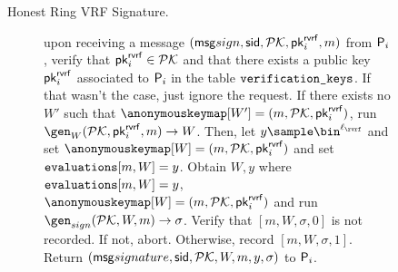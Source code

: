 \begin{figure}
\begin{tcolorbox}
{\begin{description}
				
				\item[Honest Ring VRF Signature.] upon receiving a message $(\mathsf{msg}{sign}, \textsf{sid}, {\mathcal{PK}}, \mathsf{pk}^{\mathsf{rvrf}}_i, m)$ from $\mathsf{P}_i$, verify that $\mathsf{pk}^{\mathsf{rvrf}}_i \in {\ensuremath{\mathcal{PK}}}$ and that there exists a public key $\mathsf{pk}^{\mathsf{rvrf}}_i$ associated to $\mathsf{P}_i$ in the table $ \texttt{verification\_keys} $. If that wasn't the case, just ignore the request. 	
				If there exists no $ W' $ such that $ \anonymouskeymap[W'] = (m, \pkring, \pkrvrf_i) $, run $ \gen_W(\pkring, \pkrvrf_i, m) \rightarrow W$. Then, let $y \sample \bin^{\ell_\rvrf}$ and set $ \anonymouskeymap[W] = (m, \pkring,\pkrvrf_i) $ and set $ \texttt{evaluations}[m, W] = y$.
				Obtain $ W, y $ where  $ \texttt{evaluations}[m, W] = y$, $ \anonymouskeymap[W] = (m, \pkring,\pkrvrf_i) $ and run  $ \gen_{sign}(\pkring, W, m) \rightarrow \sigma $. Verify that $ [m, W, \sigma, 0] $ is not recorded. If not, abort. Otherwise, record $ [m, W, \sigma, 1] $. Return $(\mathsf{msg}{signature}, \textsf{sid}, {\mathcal{PK}},W,m, y, \sigma)$ to $\mathsf{P}_i$.
				
				

\end{description}}
\end{tcolorbox}
\end{figure}
